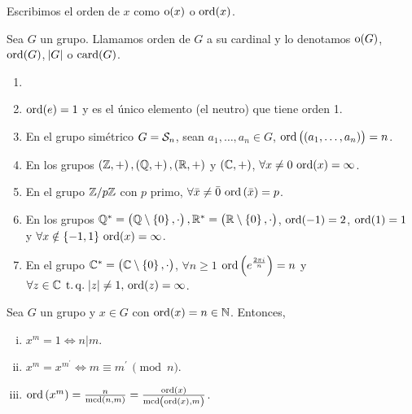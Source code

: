 \begin{obs}
    Escribimos el orden de $x$ como $\operatorname{o}(x)$ o $\operatorname{ord}(x)$.
\end{obs}

\begin{defi}
    Sea $G$ un grupo. Llamamos orden de $G$ a su cardinal y lo denotamos $\operatorname{o}(G)$, $\operatorname{ord}(G)$, $\abs{G}$ o $\operatorname{card}(G)$.
\end{defi}

\begin{example}
    \begin{enumerate}[1.]
        \item[]
        \item $\operatorname{ord}(e) = 1$ y es el único elemento (el neutro) que tiene orden 1.
        \item En el grupo simétrico $G = \mathcal{S}_n$, sean $a_1, \dots, a_n \in G$, $\operatorname{ord}\left(\left( a_1, \dots, a_n \right)\right) = n$.
        \item En los grupos $\left( \mathbb{Z}, +\right) , \left( \mathbb{Q}, +\right), \left( \mathbb{R}, +\right)$ y $\left( \mathbb{C}, +\right)$, $\forall x \neq 0 \, \operatorname{ord}(x) = \infty$.
        \item En el grupo $\mathbb{Z}/p\mathbb{Z}$ con $p$ primo, $\forall \bar{x} \neq \bar{0} \, \operatorname{ord}\left( \bar{x} \right) = p$.
        \item En los grupos $\mathbb{Q}^{\ast}=\left( \mathbb{Q}\setminus \left\{ 0\right\}, \cdot \right), \mathbb{R}^{\ast}=\left( \mathbb{R}\setminus \left\{ 0\right\}, \cdot\right)$, $\operatorname{ord}(-1) = 2$, $\operatorname{ord}(1) = 1$ y $\forall x \notin \left\{-1, 1\right\} \, \operatorname{ord}(x) = \infty$.
        \item En el grupo $\mathbb{C}^{\ast}=\left( \mathbb{C}\setminus \left\{ 0\right\}, \cdot \right)$, $\forall n \geq 1$ $\operatorname{ord}\left( e^{\frac{2 \pi i}{n}} \right) = n$ y $\forall z \in \mathbb{C} \operatorname{\;t.q.\;} \abs{z} \neq 1, \, \operatorname{ord}(z) = \infty$.
    \end{enumerate}
\end{example}

\begin{lema}
    Sea $G$ un grupo y $x \in G$ con $\operatorname{ord}(x) = n\in\mathbb{N}$. Entonces,
    \begin{enumerate}[i)]
        \item $x^m = 1 \iff n \vert m$.
        \item $x^m = x^{m^\prime} \iff m \equiv m^\prime \, \pmod{n}$.
        \item $\operatorname{ord}\left( x^m \right) = \frac{n}{\operatorname{mcd}(n, m)} = \frac{\operatorname{ord}(x)}{\operatorname{mcd}\left( \operatorname{ord}(x), m \right)}$.
    \end{enumerate}
\end{lema}

